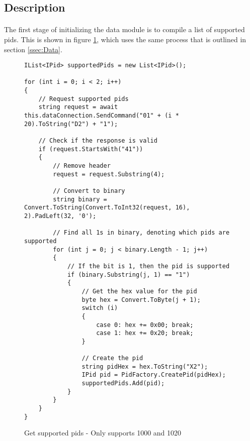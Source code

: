 	\subsection{Description}{		
		\paragraph{}{
		
		}
		
		\paragraph{}{
		The first stage of initializing the data module is to compile a list of supported pids. This is shown in figure \ref{code:SupportedPids}, which uses the same process that is outlined in section \ref{ssec:Data}.
		}
		
		\begin{figure}[h]
			\begin{lstlisting}
IList<IPid> supportedPids = new List<IPid>();

for (int i = 0; i < 2; i++)
{
	// Request supported pids
	string request = await this.dataConnection.SendCommand("01" + (i * 20).ToString("D2") + "1");

	// Check if the response is valid
	if (request.StartsWith("41"))
	{
		// Remove header
		request = request.Substring(4);

		// Convert to binary
		string binary = Convert.ToString(Convert.ToInt32(request, 16), 2).PadLeft(32, '0');

		// Find all 1s in binary, denoting which pids are supported
		for (int j = 0; j < binary.Length - 1; j++)
		{
			// If the bit is 1, then the pid is supported
			if (binary.Substring(j, 1) == "1")
			{
				// Get the hex value for the pid
				byte hex = Convert.ToByte(j + 1);
				switch (i)
				{
					case 0: hex += 0x00; break;
					case 1: hex += 0x20; break;
				}
				
				// Create the pid
				string pidHex = hex.ToString("X2");
				IPid pid = PidFactory.CreatePid(pidHex);
				supportedPids.Add(pid);
			}
		}
	}
}
			\end{lstlisting}
			\caption{Get supported pids - Only supports 1000 and 1020}
			\label{code:SupportedPids}
		\end{figure}
		
		\paragraph{}{
		}
		
}
